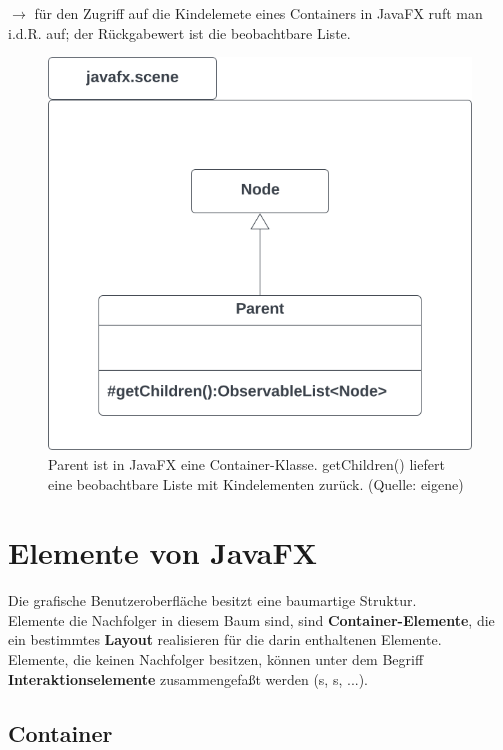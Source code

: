 \noindent
$\rightarrow$ für den Zugriff auf die Kindelemete eines Containers in JavaFX ruft man i.d.R.  auf; der Rückgabewert ist die beobachtbare Liste.

\begin{figure}
    \centering
    \includegraphics[scale=0.5]{chapters/fopt3/img/javafx/nodeparent}
    \caption{Parent ist in JavaFX eine Container-Klasse. getChildren() liefert eine beobachtbare Liste mit Kindelementen zurück. (Quelle: eigene)}
    \label{fig:nodeparent}
\end{figure}

\section{Elemente von JavaFX}

Die grafische Benutzeroberfläche besitzt eine baumartige Struktur.\\

\noindent
Elemente die Nachfolger in diesem Baum sind, sind \textbf{Container-Elemente}, die ein bestimmtes \textbf{Layout} realisieren für die darin enthaltenen Elemente.\\

\noindent
Elemente, die keinen Nachfolger besitzen, können unter dem Begriff \textbf{Interaktionselemente} zusammengefaßt werden (s, s, ...).

\subsection{Container}

